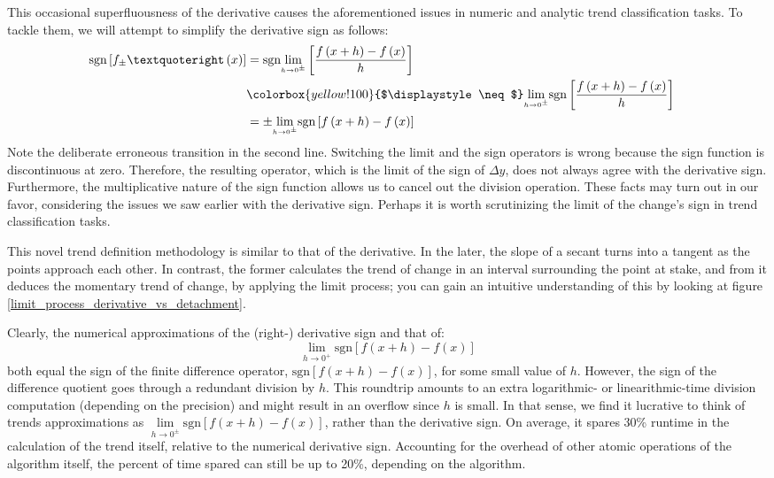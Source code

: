 \documentclass[11pt]{book}
\newcommand{\highlight}[1]{%
  \colorbox{yellow!100}{$\displaystyle#1$}}
\begin{document}
This occasional superfluousness of the derivative causes the aforementioned issues in numeric and analytic trend classification tasks. To tackle them, we will attempt to simplify the derivative sign as follows:
\begin{align}
\index{Detachment}
&\begin{aligned}
\text{sgn}\left[f_{\pm}’\left(x\right)\right] & =\text{sgn}\underset{{\scriptscriptstyle h\rightarrow0^{\pm}}}{\lim}\left[\frac{f\left(x+h\right)-f\left(x\right)}{h}\right]\\
&\highlight{\neq} \underset{{\scriptscriptstyle h\rightarrow0^{\pm}}}{\lim}\text{sgn}\left[\frac{f\left(x+h\right)-f\left(x\right)}{h}\right]\\
&=\pm\underset{{\scriptscriptstyle h\rightarrow0^{\pm}}}{\lim}\text{sgn}\left[f\left(x+h\right)-f\left(x\right)\right]
\end{aligned}
\end{align}
Note the deliberate erroneous transition in the second line. Switching the limit and the sign operators is wrong because the sign function is discontinuous at zero. Therefore, the resulting operator, which is the limit of the sign of $\Delta y$, does not always agree with the derivative sign. Furthermore, the multiplicative nature of the sign function allows us to cancel out the division operation. These facts may turn out in our favor, considering the issues we saw earlier with the derivative sign. Perhaps it is worth scrutinizing the limit of the change's sign in trend classification tasks.

This novel trend definition methodology is similar to that of the derivative. In the later, the slope of a secant turns into a tangent as the points approach each other. In contrast, the former calculates the trend of change in an interval surrounding the point at stake, and from it deduces the momentary trend of change, by applying the limit process; you can gain an intuitive understanding of this by looking at figure \ref{limit_process_derivative_vs_detachment}.

Clearly, the numerical approximations of the (right-) derivative sign and that of: $$\underset{{\scriptscriptstyle h\rightarrow0^{+}}}{\lim}\text{sgn}\left[f\left(x+h\right)-f\left(x\right)\right]$$both equal the sign of the finite difference operator, $\text{sgn}\left[f\left(x+h\right)-f\left(x\right)\right]$, for some small value of $h$. However, the sign of the difference quotient goes through a redundant division by $h$. This roundtrip amounts to an extra logarithmic- or linearithmic-time division computation (depending on the precision) and might result in an overflow since $h$ is small. In that sense, we find it lucrative to think of trends approximations as $\underset{{\scriptscriptstyle h\rightarrow0^{\pm}}}{\lim}\text{sgn}\left[f\left(x+h\right)-f\left(x\right)\right]$, rather than the derivative sign. On average, it spares 30\% runtime in the calculation of the trend itself, relative to the numerical derivative sign. Accounting for the overhead of other atomic operations of the algorithm itself, the percent of time spared can still be up to 20\%, depending on the algorithm.
\end{document}
